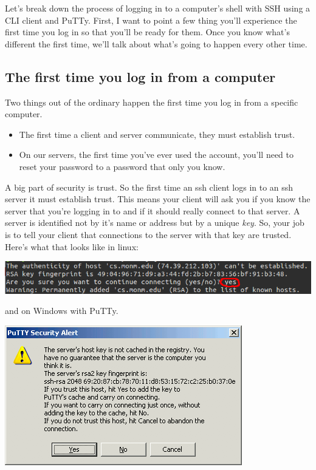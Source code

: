 \documentclass[nobib]{tufte-handout}
\begin{document}
Let's break down the process of logging in to a computer's shell with SSH using a CLI client and PuTTy.  First, I want to point a few thing you'll experience the first time you log in so that you'll be ready for them. Once you know what's different the first time, we'll talk about what's going to happen every other time.

\subsection{The first time you log in from a computer}

Two things out of the ordinary happen the first time you log in from a specific computer.
\begin{itemize}
\item The first time a client and server communicate, they must establish trust.
\item On our servers, the first time you've ever used the account, you'll need to reset your password to a password that only you know.
\end{itemize}

A big part of security is trust. So the first time an ssh client logs in to an ssh server it must establish trust.  This means your client will ask you if you know the server that you're logging in to and if it should really connect to that server. A server is identified not by it's name or address but by a unique \textit{key}. So, your job is to tell your client that connections to the server with that key are trusted.  Here's what that looks like in linux:

\vspace{.1in}
\begin{center}
\includegraphics[scale=.5]{linux-knownhost.png}
\end{center}
\vspace{.1in}


and on Windows with PuTTy.

\vspace{.1in}
\begin{center}
\includegraphics[scale=.5]{putty-host-key-warning.png}
\end{center}
\vspace{.1in}
\end{document}
